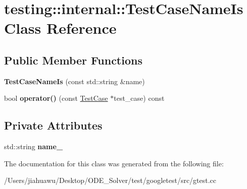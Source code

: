 \hypertarget{classtesting_1_1internal_1_1_test_case_name_is}{}\section{testing\+:\+:internal\+:\+:Test\+Case\+Name\+Is Class Reference}
\label{classtesting_1_1internal_1_1_test_case_name_is}
\subsection*{Public Member Functions}
\begin{DoxyCompactItemize}
\item 
\mbox{\label{classtesting_1_1internal_1_1_test_case_name_is_a7c983707f4cfe7f36dbabc95da5113c4}} 
{\bfseries Test\+Case\+Name\+Is} (const std\+::string \&name)
\item 
\mbox{\label{classtesting_1_1internal_1_1_test_case_name_is_aa96c4e9facbaa7043c8f0b34465d1eae}} 
bool {\bfseries operator()} (const \mbox{\hyperlink{classtesting_1_1_test_case}{Test\+Case}} $\ast$test\+\_\+case) const
\end{DoxyCompactItemize}
\subsection*{Private Attributes}
\begin{DoxyCompactItemize}
\item 
\mbox{\label{classtesting_1_1internal_1_1_test_case_name_is_a4e780c6613a81c4f14fc57e00c61474b}} 
std\+::string {\bfseries name\+\_\+}
\end{DoxyCompactItemize}


The documentation for this class was generated from the following file\+:\begin{DoxyCompactItemize}
\item 
/\+Users/jiahuawu/\+Desktop/\+O\+D\+E\+\_\+\+Solver/test/googletest/src/gtest.\+cc\end{DoxyCompactItemize}
